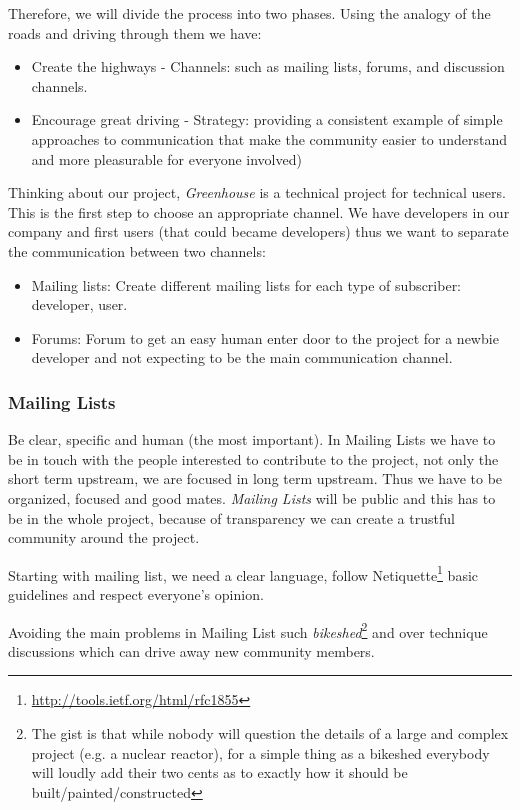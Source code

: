 \documentclass[11pt]{scrartcl}
\begin{document}
\par Therefore, we will divide the process into two phases. Using the analogy of the roads and driving through them we have:
\begin{itemize}
	\item Create the highways - Channels: such as mailing lists, forums, and discussion channels.
    \item Encourage great driving - Strategy: providing a consistent example of simple approaches to communication that make the community easier to understand and more pleasurable for everyone involved)
\end{itemize}

\par Thinking about our project, \emph{Greenhouse} is a technical project for technical users. This is the first step to choose an appropriate channel. We have developers in our company and first users (that could became developers) thus we want to separate the communication between two channels:

\begin{itemize}
	\item Mailing lists: Create different mailing lists for each type of subscriber: developer, user. 
	\item Forums: Forum to get an easy human enter door to the project for a newbie developer and not expecting to be the main communication channel.
\end{itemize}

\subsubsection{Mailing Lists}
\label{sub:mailing-lists}

\par Be clear, specific and human (the most important). In Mailing Lists we have to be in touch with the people interested to contribute to the project, not only the short term upstream, we are focused in long term upstream. Thus we have to be organized, focused and good mates. \emph{Mailing Lists} will be public and this has to be in the whole project, because of transparency we can create a trustful community around the project.

\par Starting with mailing list, we need a clear language, follow Netiquette\footnote{\url{http://tools.ietf.org/html/rfc1855}} basic guidelines and respect everyone’s opinion. 

\par Avoiding the main problems in Mailing List such \emph{bikeshed}\footnote{The gist is that while nobody will question the details of a large and complex project (e.g. a nuclear reactor), for a simple thing as a bikeshed everybody will loudly add their two cents as to exactly how it should be built/painted/constructed} and over technique discussions which can drive away new community members.
\end{document}
